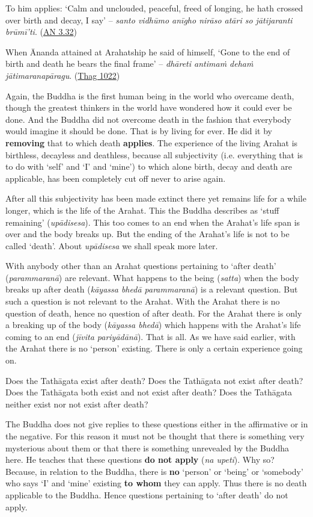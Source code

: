 To him applies: `Calm and unclouded, peaceful, freed of longing, he hath crossed over birth and decay, I say' -- \emph{santo vidhūmo anīgho nirāso atāri so jātijaranti brūmī'ti}. (\href{https://suttacentral.net/an3.32/en/bodhi}{AN 3.32})

When Ānanda attained at Arahatship he said of himself, `Gone to the end of birth and death he bears the final frame' -- \emph{dhāreti antimaṁ dehaṁ jātimaranapāragu}. (\href{https://suttacentral.net/thag17.3/en/sujato}{Thag 1022})

Again, the Buddha is the first human being in the world who overcame death, though the greatest thinkers in the world have wondered how it could ever be done. And the Buddha did not overcome death in the fashion that everybody would imagine it should be done. That is by living for ever. He did it by \textbf{removing} that to which death \textbf{applies}. The experience of the living Arahat is birthless, decayless and deathless, because all subjectivity (i.e. everything that is to do with `self' and `I' and `mine') to which alone birth, decay and death are applicable, has been completely cut off never to arise again.

After all this subjectivity has been made extinct there yet remains life for a while longer, which is the life of the Arahat. This the Buddha describes as `stuff remaining' (\emph{upādisesa}). This too comes to an end when the Arahat's life span is over and the body breaks up. But the ending of the Arahat's life is not to be called `death'. About \emph{upādisesa} we shall speak more later.

With anybody other than an Arahat questions pertaining to `after death' (\emph{parammaranā}) are relevant. What happens to the being (\emph{satta}) when the body breaks up after death (\emph{kāyassa bhedā parammaranā}) is a relevant question. But such a question is not relevant to the Arahat. With the Arahat there is no question of death, hence no question of after death. For the Arahat there is only a breaking up of the body (\emph{kāyassa bhedā}) which happens with the Arahat's life coming to an end (\emph{jīvita pariyādānā}). That is all. As we have said earlier, with the Arahat there is no `person' existing. There is only a certain experience going on.

Does the Tathāgata exist after death? Does the Tathāgata not exist after death? Does the Tathāgata both exist and not exist after death? Does the Tathāgata neither exist nor not exist after death?

The Buddha does not give replies to these questions either in the affirmative or in the negative. For this reason it must not be thought that there is something very mysterious about them or that there is something unrevealed by the Buddha here. He teaches that these questions \textbf{do not apply} (\emph{na upeti}). Why so? Because, in relation to the Buddha, there is \textbf{no} `person' or `being' or `somebody' who says `I' and `mine' existing \textbf{to whom} they can apply. Thus there is no death applicable to the Buddha. Hence questions pertaining to `after death' do not apply.

